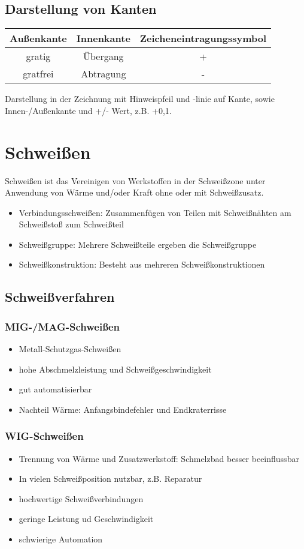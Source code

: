 \documentclass[a4paper,parskip=half*,DIV=7,fontsize=11pt]{scrartcl}
\begin{document}
\subsection{Darstellung von Kanten}
\begin{tabular}{|c|c|c|}
	\hline
	Außenkante & Innenkante & Zeicheneintragungssymbol \\
	\hline
	gratig      & Übergang  & +                        \\
	\hline
	gratfrei    & Abtragung  & -                        \\
	\hline 
\end{tabular}

Darstellung in der Zeichnung mit Hinweispfeil und -linie auf Kante, sowie Innen-/Außenkante und +/- Wert, z.B. +0,1.
	
\section{Schweißen}
Schweißen ist das Vereinigen von Werkstoffen in der Schweißzone unter
Anwendung von Wärme und/oder Kraft ohne oder mit Schweißzusatz.
\begin{itemize}
	\item Verbindungsschweißen: Zusammenfügen von Teilen mit Schweißnähten am Schweißstoß zum Schweißteil
	\item Schweißgruppe: Mehrere Schweißteile ergeben die Schweißgruppe
	\item Schweißkonstruktion: Besteht aus mehreren Schweißkonstruktionen
\end{itemize}

\subsection{Schweißverfahren}
\subsubsection{MIG-/MAG-Schweißen}
\begin{itemize}
	\item Metall-Schutzgas-Schweißen
	\item hohe Abschmelzleistung und Schweißgeschwindigkeit
	\item gut automatisierbar
	\item Nachteil Wärme: Anfangsbindefehler und Endkraterrisse
\end{itemize}
	
\subsubsection{WIG-Schweißen}
\begin{itemize}
	\item Trennung von Wärme und Zusatzwerkstoff: Schmelzbad besser beeinflussbar
	\item In vielen Schweißposition nutzbar, z.B. Reparatur
	\item hochwertige Schweißverbindungen
	\item geringe Leistung ud Geschwindigkeit
	\item schwierige Automation
\end{itemize}
\end{document}
